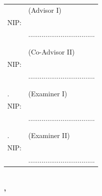 \noindent
\begin{tabularx}{\textwidth}{X l}
  \advisor{}               & (Advisor I)                         \\
  NIP: \advisornip{}       &                                     \\
                           & ................................... \\
                           &                                     \\
                           &                                     \\
  \coadvisor{}             & (Co-Advisor II)                     \\
  NIP: \coadvisornip{}     &                                     \\
                           & ................................... \\
                           &                                     \\
                           &                                     \\
  \examinerone{}.          & (Examiner I)                        \\
  NIP: \examineronenip{}   &                                     \\
                           & ................................... \\
                           &                                     \\
                           &                                     \\
  \examinertwo{}.          & (Examiner II)                       \\
  NIP: \examinertwonip{}   &                                     \\
                           & ................................... \\
\end{tabularx}
\endgroup


% 
% 

\begin{center}
  \textbf{\MakeUppercase{\place{}}\\\ENGMONTH{}, \the\year{}}
\end{center}
\endgroup
